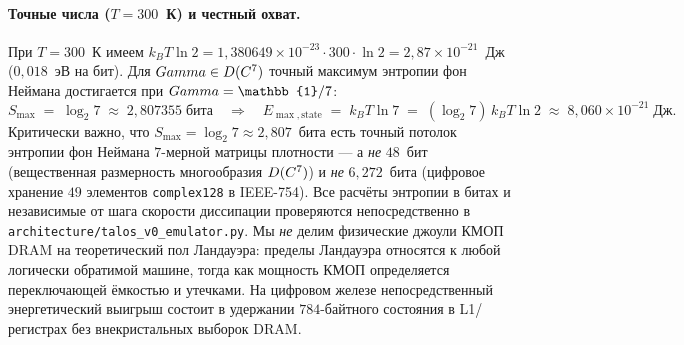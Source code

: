 \paragraph{Точные числа ($T=300$~К) и честный охват.}
При $T=300$~К имеем $k_B T\ln 2 = 1{,}380649\!\times\!10^{-23}\cdot 300\cdot\ln 2
= 2{,}87\times 10^{-21}$~Дж ($0{,}018$~эВ на бит). Для $Gamma\in D(C^7)$
точный максимум энтропии фон Неймана достигается при $\Gam=\mathbb{1}/7$:
\[
S_{\max} \;=\; \log_2 7 \;\approx\; 2{,}807355\;\text{бита}
\quad\Longrightarrow\quad
E_{\max,\text{state}} \;=\; k_B T\ln 7 \;=\; (\log_2 7)\,k_B T\ln 2
\;\approx\; 8{,}060\times 10^{-21}\;\text{Дж}.
\]
Критически важно, что $S_{\max}=\log_2 7\approx 2{,}807$~бита есть точный
потолок энтропии фон Неймана $7$-мерной матрицы плотности --- а \emph{не}
$48$~бит (вещественная размерность многообразия $D(C^7)$) и
\emph{не} $6{,}272$~бита (цифровое хранение $49$ элементов \texttt{complex128}
в IEEE-754). Все расчёты энтропии в битах и независимые от шага скорости
диссипации проверяются непосредственно в
\texttt{architecture/talos\_v0\_emulator.py}. Мы \emph{не} делим физические
джоули КМОП DRAM на теоретический пол Ландауэра: пределы Ландауэра относятся к
любой логически обратимой машине, тогда как мощность КМОП определяется
переключающей ёмкостью и утечками. На цифровом железе непосредственный
энергетический выигрыш \TALOS{} состоит в удержании $784$-байтного состояния в
L1/регистрах без внекристальных выборок DRAM.
